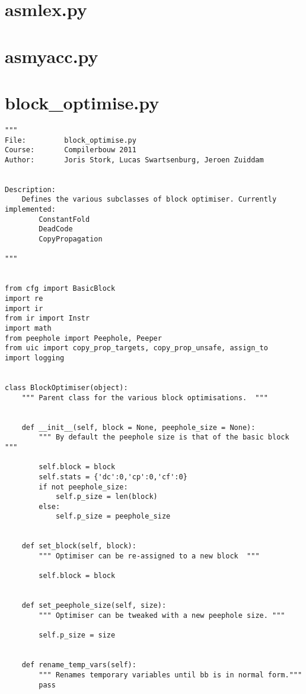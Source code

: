 \lstset{ %
language=Python,                %
}


\newpage
\section{asmlex.py}



\newpage
\section{asmyacc.py}


\newpage
\section{block\_optimise.py}
\begin{lstlisting}
""" 
File:         block_optimise.py
Course:       Compilerbouw 2011
Author:       Joris Stork, Lucas Swartsenburg, Jeroen Zuiddam


Description:
    Defines the various subclasses of block optimiser. Currently implemented:
        ConstantFold
        DeadCode
        CopyPropagation

"""


from cfg import BasicBlock
import re
import ir
from ir import Instr
import math
from peephole import Peephole, Peeper
from uic import copy_prop_targets, copy_prop_unsafe, assign_to
import logging


class BlockOptimiser(object):
    """ Parent class for the various block optimisations.  """


    def __init__(self, block = None, peephole_size = None):
        """ By default the peephole size is that of the basic block """

        self.block = block
        self.stats = {'dc':0,'cp':0,'cf':0}
        if not peephole_size:
            self.p_size = len(block)
        else:
            self.p_size = peephole_size


    def set_block(self, block):
        """ Optimiser can be re-assigned to a new block  """
        
        self.block = block


    def set_peephole_size(self, size):
        """ Optimiser can be tweaked with a new peephole size. """

        self.p_size = size


    def rename_temp_vars(self):
        """ Renames temporary variables until bb is in normal form."""
        pass


\end{lstlisting}
